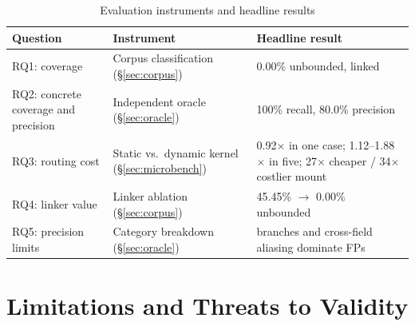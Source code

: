 \documentclass[conference]{IEEEtran}
\begin{document}
\begin{table}[h]
\centering
\caption{Evaluation instruments and headline results}
\label{tab:eval-plan}
\footnotesize
\begin{tabular}{@{}p{1.6cm}p{3.0cm}p{3.0cm}@{}}
\toprule
\textbf{Question} & \textbf{Instrument} & \textbf{Headline result} \\
\midrule
RQ1: coverage & Corpus classification (\S\ref{sec:corpus}) & 0.00\% unbounded, linked \\
RQ2: concrete coverage and precision & Independent oracle (\S\ref{sec:oracle}) & 100\% recall, 80.0\% precision \\
RQ3: routing cost & Static vs.\ dynamic kernel (\S\ref{sec:microbench}) & 0.92$\times$ in one case; 1.12--1.88$\times$ in five; 27$\times$ cheaper / 34$\times$ costlier mount \\
RQ4: linker value & Linker ablation (\S\ref{sec:corpus}) & 45.45\% $\rightarrow$ 0.00\% unbounded \\
RQ5: precision limits & Category breakdown (\S\ref{sec:oracle}) & branches and cross-field aliasing dominate FPs \\
\bottomrule
\end{tabular}
\end{table}

\section{Limitations and Threats to Validity}
\label{sec:limits}
\end{document}
